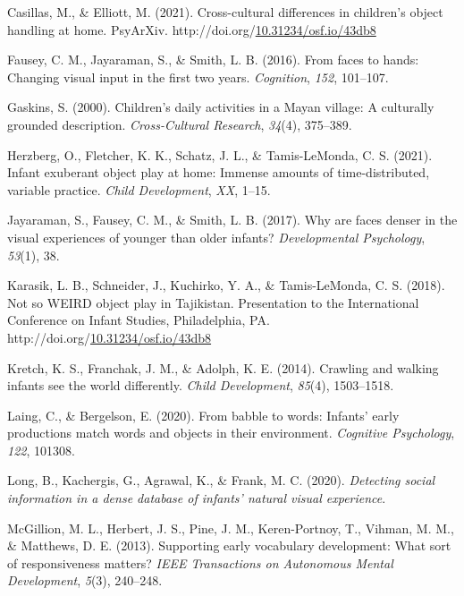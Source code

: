 \documentclass[10pt, letterpaper]{article}
\newenvironment{CSLReferences}%
  {}%
  {\par}
\begin{document}
\begin{CSLReferences}{1}{0}
\leavevmode\hypertarget{ref-casillasURdaylong}{}%
Casillas, M., \& Elliott, M. (2021). Cross-cultural differences in
children's object handling at home. PsyArXiv.
http://doi.org/\href{https://doi.org/10.31234/osf.io/43db8}{10.31234/osf.io/43db8}

\leavevmode\hypertarget{ref-fausey2016faces}{}%
Fausey, C. M., Jayaraman, S., \& Smith, L. B. (2016). From faces to
hands: Changing visual input in the first two years. \emph{Cognition},
\emph{152}, 101--107.

\leavevmode\hypertarget{ref-gaskins2000childrens}{}%
Gaskins, S. (2000). Children's daily activities in a {M}ayan village: A
culturally grounded description. \emph{Cross-Cultural Research},
\emph{34}(4), 375--389.

\leavevmode\hypertarget{ref-herzberg2021exuberant}{}%
Herzberg, O., Fletcher, K. K., Schatz, J. L., \& Tamis-LeMonda, C. S.
(2021). Infant exuberant object play at home: Immense amounts of
time-distributed, variable practice. \emph{Child Development},
\emph{XX}, 1--15.

\leavevmode\hypertarget{ref-jayaraman2017faces}{}%
Jayaraman, S., Fausey, C. M., \& Smith, L. B. (2017). Why are faces
denser in the visual experiences of younger than older infants?
\emph{Developmental Psychology}, \emph{53}(1), 38.

\leavevmode\hypertarget{ref-karasik2018not}{}%
Karasik, L. B., Schneider, J., Kuchirko, Y. A., \& Tamis-LeMonda, C. S.
(2018). Not so {WEIRD} object play in {T}ajikistan. Presentation to the
International Conference on Infant Studies, Philadelphia, PA.
http://doi.org/\href{https://doi.org/10.31234/osf.io/43db8}{10.31234/osf.io/43db8}

\leavevmode\hypertarget{ref-kretch2014crawling}{}%
Kretch, K. S., Franchak, J. M., \& Adolph, K. E. (2014). Crawling and
walking infants see the world differently. \emph{Child Development},
\emph{85}(4), 1503--1518.

\leavevmode\hypertarget{ref-laing2020babble}{}%
Laing, C., \& Bergelson, E. (2020). From babble to words: Infants' early
productions match words and objects in their environment.
\emph{Cognitive Psychology}, \emph{122}, 101308.

\leavevmode\hypertarget{ref-long2020detecting}{}%
Long, B., Kachergis, G., Agrawal, K., \& Frank, M. C. (2020).
\emph{Detecting social information in a dense database of infants'
natural visual experience}.

\leavevmode\hypertarget{ref-mcgillion2013supporting}{}%
McGillion, M. L., Herbert, J. S., Pine, J. M., Keren-Portnoy, T.,
Vihman, M. M., \& Matthews, D. E. (2013). Supporting early vocabulary
development: What sort of responsiveness matters? \emph{IEEE
Transactions on Autonomous Mental Development}, \emph{5}(3), 240--248.


\end{CSLReferences}
\end{document}
